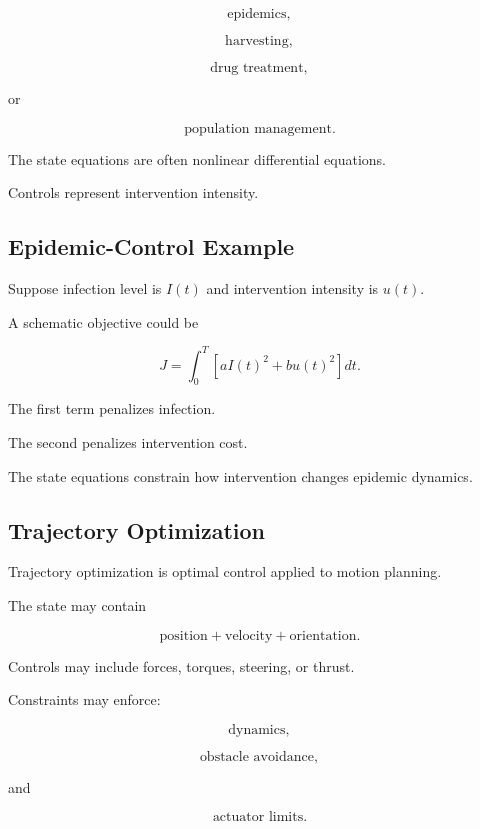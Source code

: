 \[
\boxed{
\text{epidemics},
}
\]

\[
\boxed{
\text{harvesting},
}
\]

\[
\boxed{
\text{drug treatment},
}
\]

or

\[
\boxed{
\text{population management}.
}
\]

The state equations are often nonlinear differential equations.

Controls represent intervention intensity.

\subsection{Epidemic-Control Example}
\label{subsec:epidemic-control-example}

Suppose infection level is \(I(t)\) and intervention intensity is \(u(t)\).

A schematic objective could be

\[
\boxed{
J
=
\int_0^T
\left[
aI(t)^2
+
bu(t)^2
\right]dt.
}
\]

The first term penalizes infection.

The second penalizes intervention cost.

The state equations constrain how intervention changes epidemic dynamics.

\subsection{Trajectory Optimization}
\label{subsec:trajectory-optimization}

Trajectory optimization is optimal control applied to motion planning.

The state may contain

\[
\boxed{
\text{position}
+
\text{velocity}
+
\text{orientation}.
}
\]

Controls may include forces, torques, steering, or thrust.

Constraints may enforce:

\[
\boxed{
\text{dynamics},
}
\]

\[
\boxed{
\text{obstacle avoidance},
}
\]

and

\[
\boxed{
\text{actuator limits}.
}
\]

